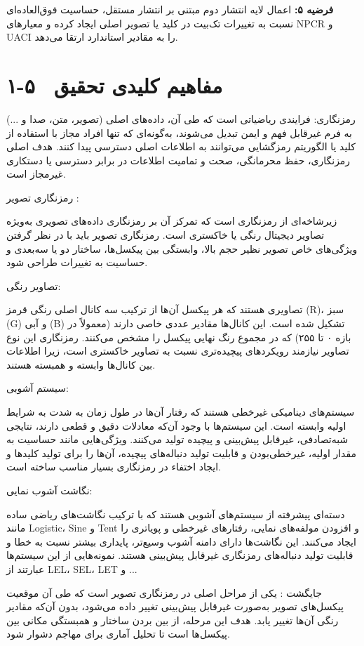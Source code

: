 \textbf{فرضیه ۵:} اعمال لایه انتشار دوم مبتنی بر انتشار مستقل، حساسیت فوق‌العاده‌ای نسبت به تغییرات تک‌بیت در کلید یا تصویر اصلی ایجاد کرده و معیارهای ‎NPCR‎ و ‎UACI‎ را به مقادیر استاندارد ارتقا می‌دهد.

\section{۱-۵  مفاهیم کلیدی تحقیق}

رمزنگاری:
فرایندی ریاضیاتی است که طی آن، داده‌های اصلی (تصویر، متن، صدا و ...) به فرم غیرقابل فهم و ایمن تبدیل می‌شوند، به‌گونه‌ای که تنها افراد مجاز با استفاده از کلید یا الگوریتم رمزگشایی می‌توانند به اطلاعات اصلی دسترسی پیدا کنند. هدف اصلی رمزنگاری، حفظ محرمانگی، صحت و تمامیت اطلاعات در برابر دسترسی یا دستکاری غیرمجاز است.

رمزنگاری تصویر :

زیرشاخه‌ای از رمزنگاری است که تمرکز آن بر رمزنگاری داده‌های تصویری به‌ویژه تصاویر دیجیتال رنگی یا خاکستری است. رمزنگاری تصویر باید با در نظر گرفتن ویژگی‌های خاص تصویر نظیر حجم بالا، وابستگی بین پیکسل‌ها، ساختار دو یا سه‌بعدی و حساسیت به تغییرات طراحی شود.

تصاویر رنگی:

تصاویری هستند که هر پیکسل آن‌ها از ترکیب سه کانال اصلی رنگی قرمز (‎R‎)، سبز (‎G‎) و آبی (‎B‎) تشکیل شده است. این کانال‌ها مقادیر عددی خاصی دارند (معمولاً در بازه ۰ تا ۲۵۵) که در مجموع رنگ نهایی پیکسل را مشخص می‌کنند. رمزنگاری این نوع تصاویر نیازمند رویکردهای پیچیده‌تری نسبت به تصاویر خاکستری است، زیرا اطلاعات بین کانال‌ها وابسته و همبسته هستند.

سیستم آشوبی:

سیستم‌های دینامیکی غیرخطی هستند که رفتار آن‌ها در طول زمان به شدت به شرایط اولیه وابسته است. این سیستم‌ها با وجود آن‌که معادلات دقیق و قطعی دارند، نتایجی شبه‌تصادفی، غیرقابل پیش‌بینی و پیچیده تولید می‌کنند. ویژگی‌هایی مانند حساسیت به مقدار اولیه، غیرخطی‌بودن و قابلیت تولید دنباله‌های پیچیده، آن‌ها را برای تولید کلیدها و ایجاد اختفاء در رمزنگاری بسیار مناسب ساخته است.

نگاشت آشوب نمایی:

دسته‌ای پیشرفته از سیستم‌های آشوبی هستند که با ترکیب نگاشت‌های ریاضی ساده مانند ‎Logistic‎، ‎Sine‎  و ‎Tent‎ و افزودن مولفه‌های نمایی، رفتارهای غیرخطی و پویاتری را ایجاد می‌کنند. این نگاشت‌ها دارای دامنه آشوب وسیع‌تر، پایداری بیشتر نسبت به خطا و قابلیت تولید دنباله‌های رمزنگاری غیرقابل پیش‌بینی هستند. نمونه‌هایی از این سیستم‌ها عبارتند از ‎LEL‎، ‎SEL‎، ‎LET‎  و ...

جایگشت :
یکی از مراحل اصلی در رمزنگاری تصویر است که طی آن موقعیت پیکسل‌های تصویر به‌صورت غیرقابل پیش‌بینی تغییر داده می‌شود، بدون آن‌که مقادیر رنگی آن‌ها تغییر یابد. هدف این مرحله، از بین بردن ساختار و همبستگی مکانی بین پیکسل‌ها است تا تحلیل آماری برای مهاجم دشوار شود.


